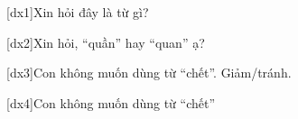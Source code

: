 [dx1]Xin hỏi đây là từ gì?

[dx2]Xin hỏi, ``quần'' hay ``quan'' ạ?

[dx3]Con không muốn dùng từ ``chết''. Giảm/tránh.

[dx4]Con không muốn dùng từ ``chết''